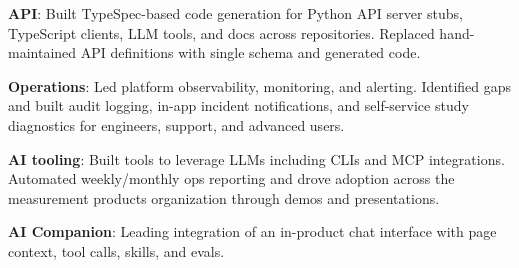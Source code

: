 \documentclass[letterpaper,11pt]{article}
\newcommand{\resumeItem}[2]{
  \item\small{
    \textbf{#1}{: #2 \vspace{-2pt}}
  }
}
\begin{document}
       \resumeItem{API}{Built TypeSpec-based code generation for Python API server stubs, TypeScript clients, LLM tools, and docs across repositories. Replaced hand-maintained API definitions with single schema and generated code.}
       \resumeItem{Operations}{Led platform observability, monitoring, and alerting. Identified gaps and built audit logging, in-app incident notifications, and self-service study diagnostics for engineers, support, and advanced users.}
       \resumeItem{AI tooling}{Built tools to leverage LLMs including CLIs and MCP integrations. Automated weekly/monthly ops reporting and drove adoption across the measurement products organization through demos and presentations.}
       \resumeItem{AI Companion}{Leading integration of an in-product chat interface with page context, tool calls, skills, and evals.}
    
\end{document}
